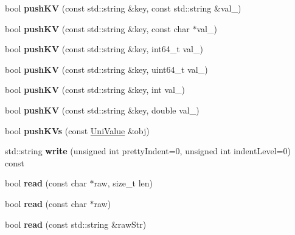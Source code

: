 \begin{DoxyCompactItemize}
bool {\bfseries push\+KV} (const std\+::string \&key, const std\+::string \&val\+\_\+)
\item 
\mbox{\label{class_uni_value_aec762a3e614c9016ad0b56b5bb2a8a9f}} 
bool {\bfseries push\+KV} (const std\+::string \&key, const char $\ast$val\+\_\+)
\item 
\mbox{\label{class_uni_value_ae12c09d0c1bb9c711f1658902948e573}} 
bool {\bfseries push\+KV} (const std\+::string \&key, int64\+\_\+t val\+\_\+)
\item 
\mbox{\label{class_uni_value_afc8d1bcbcd661dba6b3b28486b0a71d7}} 
bool {\bfseries push\+KV} (const std\+::string \&key, uint64\+\_\+t val\+\_\+)
\item 
\mbox{\label{class_uni_value_a3936ebd20222b7e8ac0dc1ba4945114b}} 
bool {\bfseries push\+KV} (const std\+::string \&key, int val\+\_\+)
\item 
\mbox{\label{class_uni_value_aa3a8cff070423090606906fade4bc7f4}} 
bool {\bfseries push\+KV} (const std\+::string \&key, double val\+\_\+)
\item 
\mbox{\label{class_uni_value_a89821b3f48732c1539e674378cdf7a87}} 
bool {\bfseries push\+K\+Vs} (const \mbox{\hyperlink{class_uni_value}{Uni\+Value}} \&obj)
\item 
\mbox{\label{class_uni_value_a8055f724aa8d0d33fa0467128922a75d}} 
std\+::string {\bfseries write} (unsigned int pretty\+Indent=0, unsigned int indent\+Level=0) const
\item 
\mbox{\label{class_uni_value_aefa2e6ba985096b7693f274a4fad92dd}} 
bool {\bfseries read} (const char $\ast$raw, size\+\_\+t len)
\item 
\mbox{\label{class_uni_value_a7a2b0e2861c456dc4966e5793453736d}} 
bool {\bfseries read} (const char $\ast$raw)
\item 
\mbox{\label{class_uni_value_aedc51fc46ef1c5c3e60bf1a9219bbdc8}} 
bool {\bfseries read} (const std\+::string \&raw\+Str)
\item 

\end{DoxyCompactItemize}
